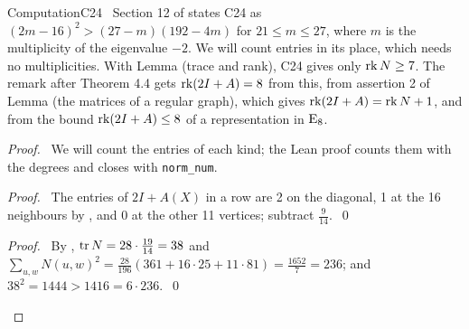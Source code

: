 \begin{namedresult}{Computation}{C24}\label{comp:C24}
 \uses{}
 \new\ Section 12 of  states C24 as $(2m-16)^2>(27-m)(192-4m)$
 for $21\le m\le27$, where $m$ is the
 multiplicity of the eigenvalue $-2$. We will count entries in its place, which needs no
 multiplicities. With Lemma (trace and rank), C24 gives only
 $\mathop{\mathrm{rk}}\nolimits N\ge7$. The remark after Theorem 4.4 gets $\mathop{\mathrm{rk}}\nolimits(2I+A)=8$ from this, from assertion 2 of
 Lemma (the matrices of a regular graph), which gives $\mathop{\mathrm{rk}}\nolimits(2I+A)=\mathop{\mathrm{rk}}\nolimits N+1$, and from the bound
 $\mathop{\mathrm{rk}}\nolimits(2I+A)\le8$ of a representation in $\mathrm{E}_8$.
\end{namedresult}
\begin{proof}
 \pfsketch\ We will count the entries of each kind; the Lean proof counts them with the degrees
 and closes with \texttt{norm\_num}.
 \begin{proof}\pf\ The entries of $2I+A(X)$ in a row are 2 on the diagonal, 1 at the 16
  neighbours by , and 0 at the other 11 vertices; subtract $\frac9{14}$.~\qed\end{proof}
 \qedstep
 \begin{proof}\pf\ By , $\mathop{\mathrm{tr}}\nolimits N=28\cdot\frac{19}{14}=38$ and
  $\sum_{u,w}N(u,w)^2=\frac{28}{196}(361+16\cdot25+11\cdot81)=\frac{1652}7=236$; and
  $38^2=1444>1416=6\cdot236$.~\qed\end{proof}
\end{proof}


